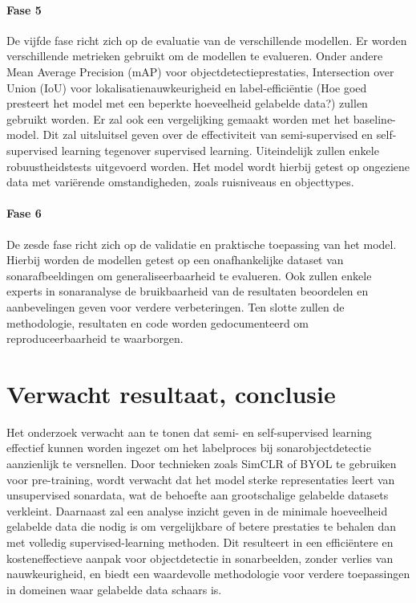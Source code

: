 \paragraph{Fase 5}

De vijfde fase richt zich op de evaluatie van de verschillende modellen. Er worden verschillende metrieken gebruikt om de modellen te evalueren. Onder andere Mean Average Precision (mAP) voor objectdetectieprestaties, Intersection over Union (IoU) voor lokalisatienauwkeurigheid en label-efficiëntie (Hoe goed presteert het model met een beperkte hoeveelheid gelabelde data?) zullen gebruikt worden. Er zal ook een vergelijking gemaakt worden met het baseline-model. Dit zal uitsluitsel geven over de effectiviteit van semi-supervised en self-supervised learning tegenover supervised learning. Uiteindelijk zullen enkele robuustheidstests uitgevoerd worden. Het model wordt hierbij getest op ongeziene data met variërende omstandigheden, zoals ruisniveaus en objecttypes.

\paragraph{Fase 6}

De zesde fase richt zich op de validatie en praktische toepassing van het model. Hierbij worden de modellen getest op een onafhankelijke dataset van sonarafbeeldingen om generaliseerbaarheid te evalueren. Ook zullen enkele experts in sonaranalyse de bruikbaarheid van de resultaten beoordelen en aanbevelingen geven voor verdere verbeteringen. Ten slotte zullen de methodologie, resultaten en code worden gedocumenteerd om reproduceerbaarheid te waarborgen.

\section{Verwacht resultaat, conclusie}%
\label{sec:verwachte_resultaten}

Het onderzoek verwacht aan te tonen dat semi- en self-supervised learning effectief kunnen worden ingezet om het labelproces bij sonarobjectdetectie aanzienlijk te versnellen. Door technieken zoals SimCLR of BYOL te gebruiken voor pre-training, wordt verwacht dat het model sterke representaties leert van unsupervised sonardata, wat de behoefte aan grootschalige gelabelde datasets verkleint. Daarnaast zal een analyse inzicht geven in de minimale hoeveelheid gelabelde data die nodig is om vergelijkbare of betere prestaties te behalen dan met volledig supervised-learning methoden. Dit resulteert in een efficiëntere en kosteneffectieve aanpak voor objectdetectie in sonarbeelden, zonder verlies van nauwkeurigheid, en biedt een waardevolle methodologie voor verdere toepassingen in domeinen waar gelabelde data schaars is.

